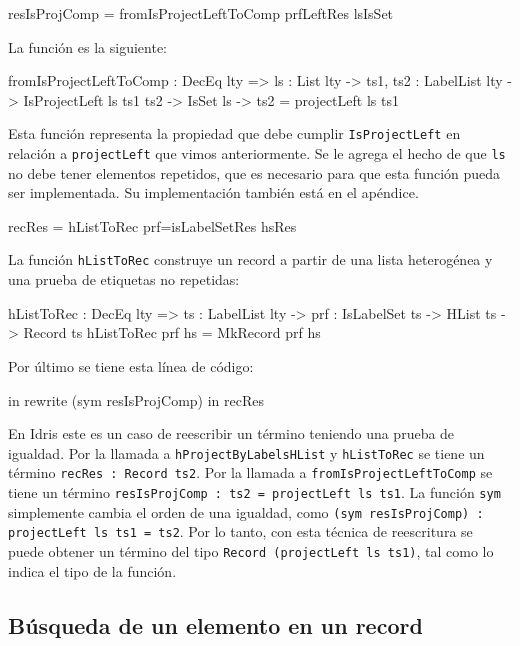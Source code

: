 \begin{code}
resIsProjComp = fromIsProjectLeftToComp prfLeftRes lsIsSet
\end{code}

La función es la siguiente:

\begin{code}
fromIsProjectLeftToComp : DecEq lty => {ls : List lty} ->
  {ts1, ts2 : LabelList lty} -> IsProjectLeft ls ts1 ts2 ->
  IsSet ls -> ts2 = projectLeft ls ts1
\end{code}

Esta función representa la propiedad que debe cumplir \texttt{IsProjectLeft} en relación a \texttt{projectLeft} que vimos anteriormente. Se le agrega el hecho de que \texttt{ls} no debe tener elementos repetidos, que es necesario para que esta función pueda ser implementada. Su implementación también está en el apéndice.

\begin{code}
recRes = hListToRec {prf=isLabelSetRes} hsRes
\end{code}

La función \texttt{hListToRec} construye un record a partir de una lista heterogénea y una prueba de etiquetas no repetidas:

\begin{code}
hListToRec : DecEq lty => {ts : LabelList lty} ->
  {prf : IsLabelSet ts} -> HList ts -> Record ts
hListToRec {prf} hs = MkRecord prf hs
\end{code}

Por último se tiene esta línea de código:

\begin{code}
in rewrite (sym resIsProjComp) in recRes
\end{code}

En Idris este es un caso de reescribir un término teniendo una prueba de igualdad. Por la llamada a \texttt{hProjectByLabelsHList} y \texttt{hListToRec} se tiene un término \texttt{recRes : Record ts2}. Por la llamada a \texttt{fromIsProjectLeftToComp} se tiene un término \texttt{resIsProjComp : ts2 = projectLeft ls ts1}. La función \texttt{sym} simplemente cambia el orden de una igualdad, como \texttt{(sym resIsProjComp) : projectLeft ls ts1 = ts2}. Por lo tanto, con esta técnica de reescritura se puede obtener un término del tipo \texttt{Record (projectLeft ls ts1)}, tal como lo indica el tipo de la función.

\subsection{Búsqueda de un elemento en un record}


